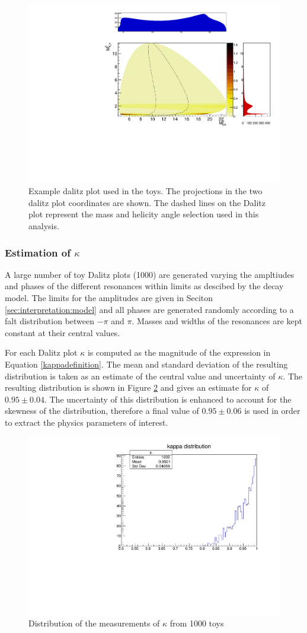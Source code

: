 \begin{figure}[h]
\centering
\includegraphics[width=0.8\linewidth]{figures/results/dalitz.pdf}
\caption{Example dalitz plot used in the toys. The projections in the two dalitz plot coordinates are shown. The dashed lines on the Dalitz plot represent the \Kstar mass and \KS helicity angle selection used in this analysis.}
\label{dalitzplot}
\end{figure}

\subsubsection{Estimation of $\kappa$}

A large number of toy Dalitz plots (1000) are generated varying the ampltiudes and phases of the different resonances within limits as descibed by the decay model. The limits for the amplitudes are given in Seciton \ref{sec:interpretation:model} and all phases are generated randomly according to a falt distribution between $-\pi$ and $\pi$. Masses and widths of the resonances are kept constant at their central values. 

For each Dalitz plot $\kappa$ is computed as the magnitude of the expression in Equation \ref{kappadefinition}. The mean and standard deviation of the resulting distribution is taken as an estimate of the central value and uncertainty of $\kappa$. The resulting distribution is shown in Figure \ref{kappadistribution} and gives an estimate for $\kappa$ of $0.95 \pm 0.04$. The uncertainty of this distribution is enhanced to account for the skewness of the distribution, therefore a final value of $0.95 \pm 0.06$ is used in order to extract the physics parameters of interest.

\begin{figure}[h]
\centering
\includegraphics[width=0.5\linewidth]{figures/results/kappa.pdf}
\caption{Distribution of the measurements of $\kappa$ from 1000 toys}
\label{kappadistribution}
\end{figure}

